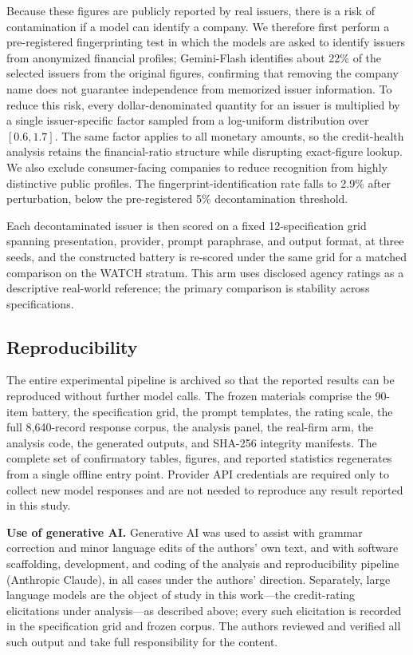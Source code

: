 \documentclass[pdflatex,sn-nature,lineno]{sn-jnl}
\theoremstyle{thmstyleone}
\begin{document}
Because these figures are publicly reported by real issuers, there is a risk of contamination if a model
can identify a company. We therefore first perform a pre-registered fingerprinting test in which the
models are asked to identify issuers from anonymized financial profiles; Gemini-Flash identifies about
22\% of the selected issuers from the original figures, confirming that removing the company name does not
guarantee independence from memorized issuer information. To reduce this risk, every dollar-denominated
quantity for an issuer is multiplied by a single issuer-specific factor sampled from a log-uniform
distribution over $[0.6,1.7]$. The same factor applies to all monetary amounts, so the credit-health
analysis retains the financial-ratio structure while disrupting exact-figure lookup. We also
exclude consumer-facing companies to reduce recognition from highly distinctive public profiles. The
fingerprint-identification rate falls to 2.9\% after perturbation, below the pre-registered 5\%
decontamination threshold.

Each decontaminated issuer is then scored on a fixed 12-specification grid spanning presentation,
provider, prompt paraphrase, and output format, at three seeds, and the constructed battery is re-scored
under the same grid for a matched comparison on the WATCH stratum. This arm uses disclosed agency ratings
as a descriptive real-world reference; the primary comparison is stability across specifications.

\subsection{Reproducibility}
The entire experimental pipeline is archived so that the reported results can be reproduced without
further model calls. The frozen materials comprise the 90-item battery, the specification grid, the
prompt templates, the rating scale, the full 8{,}640-record response corpus, the analysis panel, the
real-firm arm, the analysis code, the generated outputs, and SHA-256 integrity manifests. The complete
set of confirmatory tables, figures, and reported statistics regenerates from a single offline entry
point. Provider API credentials are required only to collect new model responses and are not needed to
reproduce any result reported in this study.

\textbf{Use of generative AI.} Generative AI was used to assist with grammar correction and minor
language edits of the authors' own text, and with software scaffolding, development, and coding of the
analysis and reproducibility pipeline (Anthropic Claude), in all cases under the authors' direction.
Separately, large language models are the object of study in this work---the credit-rating elicitations
under analysis---as described above; every such elicitation is recorded in the specification grid and
frozen corpus. The authors reviewed and verified all such output and take full responsibility for the
content.
\end{document}
